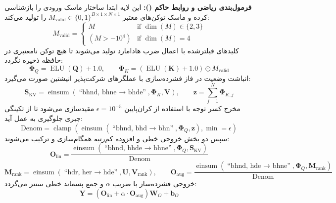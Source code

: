 \textbf{فرمول‌بندی ریاضی و روابط حاکم ():}
این لایه ابتدا ساختار ماسک ورودی را بازشناسی کرده و ماسک توکن‌های معتبر $M_{\text{valid}} \in \{0, 1\}^{B \times 1 \times N \times 1}$ را تولید می‌کند:
\begin{equation}
M_{\text{valid}} = \begin{cases}
M & \text{if } \operatorname{dim}(M) \in \{2, 3\} \\
(M > -10^4) & \text{if } \operatorname{dim}(M) = 4
\end{cases}
\end{equation}
کلیدهای فیلترشده با اعمال ضرب هادامارد تولید می‌شوند تا هیچ توکن نامعتبری در حافظه ذخیره نگردد:
\begin{equation}
\mathbf{\Phi}_Q = \operatorname{ELU}(\mathbf{Q}) + 1.0, \qquad \mathbf{\Phi}_K = (\operatorname{ELU}(\mathbf{K}) + 1.0) \odot M_{\text{valid}}
\end{equation}
انباشت وضعیت در فاز فشرده‌سازی با عملگرهای شرکت‌پذیر انیشتین صورت می‌گیرد:
\begin{equation}
\mathbf{S}_{\text{KV}} = \operatorname{einsum}(\text{``bhnd, bhne $\to$ bhde''}, \mathbf{\Phi}_K, \mathbf{V}), \qquad
\mathbf{z} = \sum_{j=1}^N \mathbf{\Phi}_{K, j}
\end{equation}
مخرج کسر توجه با استفاده از کران‌پایین $\epsilon = 10^{-5}$ مقیدسازی می‌شود تا از تکینگی جبری جلوگیری به عمل آید:
\begin{equation}
\text{Denom} = \operatorname{clamp}(\operatorname{einsum}(\text{``bhnd, bhd $\to$ bhn''}, \mathbf{\Phi}_Q, \mathbf{z}), \min=\epsilon)
\end{equation}
سپس دو بخش خروجی خطی و افزوده کم‌رتبه همگام‌سازی و ترکیب می‌شوند:
\begin{equation}
\mathbf{O}_{\text{lin}} = \frac{\operatorname{einsum}(\text{``bhnd, bhde $\to$ bhne''}, \mathbf{\Phi}_Q, \mathbf{S}_{\text{KV}})}{\text{Denom}}
\end{equation}
\begin{equation}
\mathbf{M}_{\text{rank}} = \operatorname{einsum}(\text{``hdr, her $\to$ hde''}, \mathbf{U}, \mathbf{V}_{\text{rank}}), \qquad
\mathbf{O}_{\text{aug}} = \frac{\operatorname{einsum}(\text{``bhnd, hde $\to$ bhne''}, \mathbf{\Phi}_Q, \mathbf{M}_{\text{rank}})}{\text{Denom}}
\end{equation}
خروجی فشرده‌ساز با ضریب $\alpha$ و جمع پسماند خطی سنتز می‌گردد:
\begin{equation}
\mathbf{Y} = (\mathbf{O}_{\text{lin}} + \alpha \cdot \mathbf{O}_{\text{aug}}) \mathbf{W}_O + \mathbf{b}_O
\end{equation}

